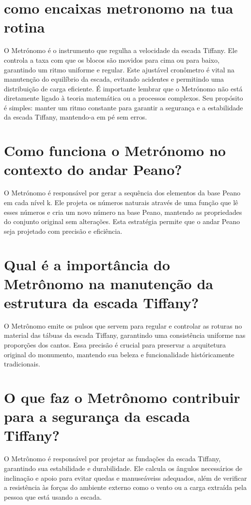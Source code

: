 \documentclass[11pt,a4paper]{article}
\begin{document}
\section{como encaixas metronomo na tua rotina}
O Metrónomo é o instrumento que regulha a velocidade da escada Tiffany. Ele controla a taxa com que os blocos são movidos para cima ou para baixo, garantindo um ritmo uniforme e regular. Este ajustável cronômetro é vital na manutenção do equilíbrio da escada, evitando acidentes e permitindo uma distribuição de carga eficiente. É importante lembrar que o Metrónomo não está diretamente ligado à teoria matemática ou a processos complexos. Seu propósito é simples: manter um ritmo constante para garantir a segurança e a estabilidade da escada Tiffany, mantendo-a em pé sem erros.

\section{Como funciona o Metrónomo no contexto do andar Peano?}
O Metrónomo é responsável por gerar a sequência dos elementos da base Peano em cada nível k. Ele projeta os números naturais através de uma função que lê esses números e cria um novo número na base Peano, mantendo as propriedades do conjunto original sem alterações. Esta estratégia permite que o andar Peano seja projetado com precisão e eficiência.

\section{Qual é a importância do Metrônomo na manutenção da estrutura da escada Tiffany?}
O Metrônomo emite os pulsos que servem para regular e controlar as roturas no material das tábuas da escada Tiffany, garantindo uma consistência uniforme nas proporções dos cantos. Essa precisão é crucial para preservar a arquitetura original do monumento, mantendo sua beleza e funcionalidade históricamente tradicionais.

\section{O que faz o Metrônomo contribuir para a segurança da escada Tiffany?}
O Metrônomo é responsável por projetar as fundações da escada Tiffany, garantindo sua estabilidade e durabilidade. Ele calcula os ângulos necessários de inclinação e apoio para evitar quedas e manuseáveiss adequados, além de verificar a resistência às forças do ambiente externo como o vento ou a carga extraída pela pessoa que está usando a escada.
\end{document}
